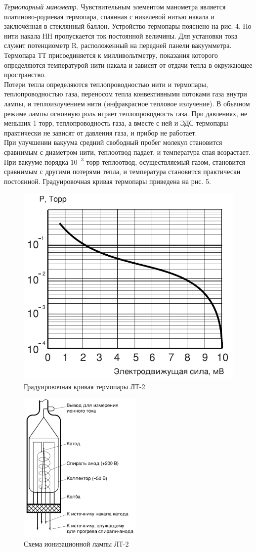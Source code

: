 \documentclass[a4paper, 12pt]{article}
\begin{document}
\textit{Термопарный манометр.} Чувствительным элементом манометра является платиново-родиевая термопара, спаянная с никелевой нитью накала и заключённая в стеклянный баллон. Устройство термопары пояснено на рис. 4. По нити накала НН пропускается ток постоянной величины. Для установки тока служит потенциометр R, расположенный на передней панели вакуумметра. Термопара ТТ присоединяется к милливольтметру, показания которого определяются температурой нити накала и зависят от отдачи тепла в окружающее пространство. \\
Потери тепла определяются теплопроводностью нити и термопары, теплопроводностью газа, переносом тепла конвективными потоками газа внутри лампы, и теплоизлучением нити (инфракрасное тепловое излучение). В обычном режиме лампы основную роль играет теплопроводность газа. При давлениях, не меньших 1 торр, теплопроводность газа, а вместе с ней и ЭДС термопары практически не зависят от давления газа, и прибор не работает. \\
При улучшении вакуума средний свободный пробег молекул становится сравнимым с диаметром нити, теплоотвод падает, и температура спая возрастает. При вакууме порядка $10^{-3}$ торр теплоотвод, осуществляемый газом, становится сравнимым с другими потерями тепла, и температура становится практически постоянной. Градуировочная кривая термопары приведена на рис. 5. \\
\begin{figure}[!h]
\centering
\includegraphics[width=0.4\linewidth]{curve.png}
\caption[]{Градуировочная кривая термопары ЛТ-2}
\label{fig:Градуировочная кривая}
\end{figure}
\newpage
\begin{figure} %
\begin{center}
   \includegraphics[width=60mm]{lamp.png}
   \caption{Схема ионизационной лампы ЛТ-2}
   \label{fig:лампа}
\end{center}
\end{figure}
\end{document}

